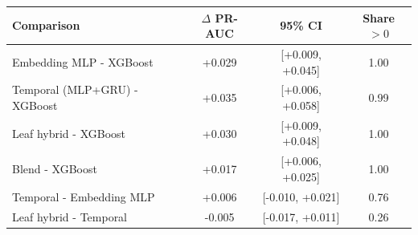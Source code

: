 \begin{tabular}{lccc}
\toprule
Comparison & $\Delta$ PR-AUC & 95\% CI & Share $>0$ \\
\midrule
Embedding MLP - XGBoost & +0.029 & [+0.009, +0.045] & 1.00 \\
Temporal (MLP+GRU) - XGBoost & +0.035 & [+0.006, +0.058] & 0.99 \\
Leaf hybrid - XGBoost & +0.030 & [+0.009, +0.048] & 1.00 \\
Blend - XGBoost & +0.017 & [+0.006, +0.025] & 1.00 \\
Temporal - Embedding MLP & +0.006 & [-0.010, +0.021] & 0.76 \\
Leaf hybrid - Temporal & -0.005 & [-0.017, +0.011] & 0.26 \\
\bottomrule
\end{tabular}
